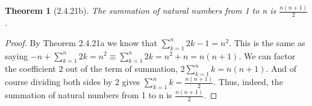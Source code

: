\documentclass[a4paper, 12pt]{article}
\theoremstyle{plain}
\newtheorem*{theorem*}{Theorem}
\begin{document}
	
	\begin{theorem*}[2.4.21b]
		The summation of natural numbers from 1 to n is $\frac{n(n+1)}{2}$.
	\end{theorem*}
	
	\begin{proof}
		By Theorem 2.4.21a we know that $\sum_{k=1}^{n} 2k - 1 = n^{2}$. This is the same as saying $-n + \sum_{k=1}^{n} 2k = n^{2} \equiv \sum_{k=1}^{n} 2k = n^{2} + n = n(n + 1)$. We can factor the coefficient $2$ out of the term of summation, $2 \sum_{k=1}^{n} k = n(n+1)$. And of course dividing both sides by $2$ gives $\sum_{k=1}^{n} k = \frac{n(n+1)}{2}$. Thus, indeed, the summation of natural numbers from 1 to n is $\frac{n(n+1)}{2}$.
	\end{proof}
\end{document}
